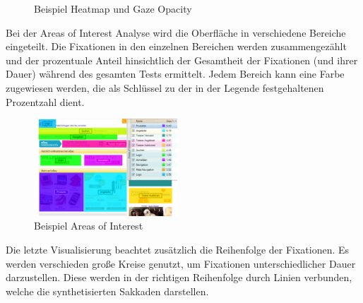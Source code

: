 \begin{figure}[H] 
	\centering
	\hspace{1.0em}
	\caption{Beispiel Heatmap und Gaze Opacity \cite{Henrici2010}}
	\label{fig:heatmapGazeOpacity}
\end{figure}
Bei der Areas of Interest Analyse wird die Oberfläche in verschiedene Bereiche eingeteilt. Die Fixationen in den einzelnen Bereichen werden zusammengezählt und der prozentuale Anteil hinsichtlich der Gesamtheit der Fixationen (und ihrer Dauer) während des gesamten Tests ermittelt. Jedem Bereich kann eine Farbe zugewiesen werden, die als Schlüssel zu der in der Legende festgehaltenen Prozentzahl dient.
\begin{figure}[H]
 \centering
 \includegraphics[width=0.48\textwidth]{grafiken/areas_of_interest.png}
 \caption{Beispiel Areas of Interest \cite{Henrici2010}}
 \label{fig:areasOfInterest}
\end{figure}
Die letzte Visualisierung beachtet zusätzlich die Reihenfolge der Fixationen. Es werden verschieden große Kreise genutzt, um Fixationen unterschiedlicher Dauer darzustellen. Diese werden in der richtigen Reihenfolge durch Linien verbunden, welche die synthetisierten Sakkaden darstellen.
